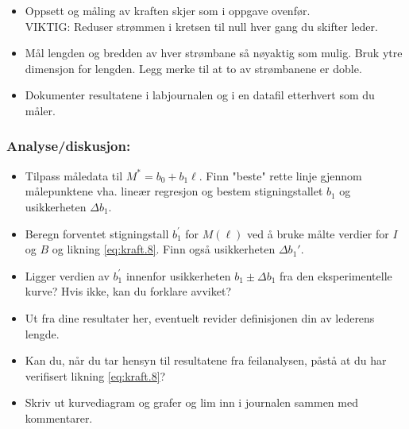 \documentclass[../Elmag-labhefte-2020.tex]{subfiles}
\begin{document}
%
\begin{itemize}
\vspace{-4mm} 
    \item Oppsett og måling av kraften skjer som i oppgave ovenfør. 
    \\ VIKTIG: Reduser strømmen i kretsen til null hver gang du skifter leder. 
    \item Mål lengden og bredden av hver strømbane så nøyaktig som mulig. Bruk ytre dimensjon for lengden. Legg merke til at to av strømbanene er doble. 
    \item Dokumenter resultatene i labjournalen og i en datafil etterhvert som du måler.
\end{itemize}

\subsubsection{Analyse/diskusjon:}

\vspace{-4mm} 
\begin{itemize}
    \item Tilpass måledata til $M^\ast = b_0 + b_1\ell$. Finn "beste" rette linje gjennom målepunktene vha. lineær regresjon og bestem stigningstallet $b_1$ og usikkerheten $\Delta b_1$.
    \item Beregn forventet stigningstall $b_1^\prime$ for $M(\ell)$ ved å bruke målte verdier for $I$ og $B$ og likning \eqref{eq:kraft.8}. Finn også usikkerheten $\Delta b_1'$.
    \item Ligger verdien av $b_1^\prime$ innenfor usikkerheten $b_1 \pm \Delta b_1$ fra den eksperimentelle kurve? Hvis ikke, kan du forklare avviket?
    \item Ut fra dine resultater her, eventuelt revider definisjonen din av lederens lengde.
    \item Kan du, når du tar hensyn til resultatene fra feilanalysen, påstå at du har verifisert likning \eqref{eq:kraft.8}?
    \item Skriv ut kurvediagram og grafer og lim inn i journalen sammen med kommentarer.
\end{itemize}
\end{document}

